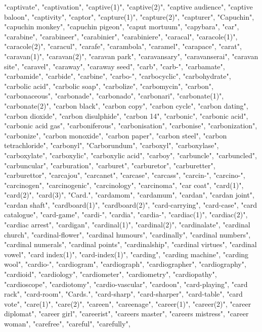 "captivate",
"captivation",
"captive(1)",
"captive(2)",
"captive audience",
"captive baloon",
"captivity",
"captor",
"capture(1)",
"capture(2)",
"capturer",
"Capuchin",
"capuchin monkey",
"capuchin pigeon",
"caput mortuum",
"capybara",
"car",
"carabine",
"carabineer",
"carabinier",
"carabiniere",
"caracal",
"caracole(1)",
"caracole(2)",
"caracul",
"carafe",
"carambola",
"caramel",
"carapace",
"carat",
"caravan(1)",
"caravan(2)",
"caravan park",
"caravansary",
"caravanserai",
"caravan site",
"caravel",
"caraway",
"caraway seed",
"carb",
"carb-",
"carbamate",
"carbamide",
"carbide",
"carbine",
"carbo-",
"carbocyclic",
"carbohydrate",
"carbolic acid",
"carbolic soap",
"carbolize",
"carbomycin",
"carbon",
"carbonaceous",
"carbonade",
"carbonado",
"carbonari",
"carbonate(1)",
"carbonate(2)",
"carbon black",
"carbon copy",
"carbon cycle",
"carbon dating",
"carbon dioxide",
"carbon disulphide",
"carbon 14",
"carbonic",
"carbonic acid",
"carbonic acid gas",
"carboniferous",
"carbonisation",
"carbonise",
"carbonization",
"carbonize",
"carbon monoxide",
"carbon paper",
"carbon steel",
"carbon tetrachloride",
"carbonyl",
"Carborundum",
"carboxyl",
"carboxylase",
"carboxylate",
"carboxylic",
"carboxylic acid",
"carboy",
"carbuncle",
"carbuncled",
"carbuncular",
"carburation",
"carburet",
"carburetor",
"carburetter",
"carburettor",
"carcajou",
"carcanet",
"carcase",
"carcass",
"carcin-",
"carcino-",
"carcinogen",
"carcinogenic",
"carcinology",
"carcinoma",
"car coat",
"card(1)",
"card(2)",
"card(3)",
"Card.",
"cardamom",
"cardamum",
"cardan",
"cardan joint",
"cardan shaft",
"cardboard(1)",
"cardboard(2)",
"card-carrying",
"card-case",
"card catalogue",
"card-game",
"cardi-",
"cardia",
"cardia-",
"cardiac(1)",
"cardiac(2)",
"cardiac arrest",
"cardigan",
"cardinal(1)",
"cardinal(2)",
"cardinalate",
"cardinal church",
"cardinal-flower",
"cardinal humours",
"cardinally",
"cardinal numbers",
"cardinal numerals",
"cardinal points",
"cardinalship",
"cardinal virtues",
"cardinal vowel",
"card index(1)",
"card-index(1)",
"carding",
"carding machine",
"carding wool",
"cardio-",
"cardiogram",
"cardiograph",
"cardiographer",
"cardiography",
"cardioid",
"cardiology",
"cardiometer",
"cardiometry",
"cardiopathy",
"cardioscope",
"cardiotomy",
"cardio-vascular",
"cardoon",
"card-playing",
"card rack",
"card-room",
"Cards.",
"card-sharp",
"card-sharper",
"card-table",
"card vote",
"care(1)",
"care(2)",
"careen",
"careenage",
"career(1)",
"career(2)",
"career diplomat",
"career girl",
"careerist",
"careers master",
"careers mistress",
"career woman",
"carefree",
"careful",
"carefully",
